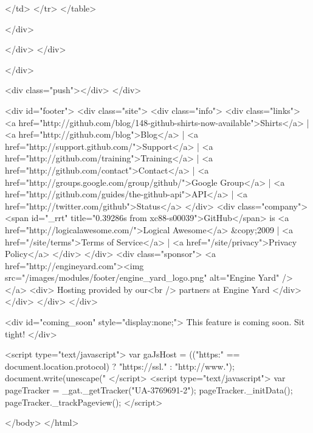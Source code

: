           </td>
        </tr>
      </table>
    
  </div>


      </div>
    </div>
    
  


  </div>

      
      
      <div class="push"></div>
    </div>
    
    <div id="footer">
      <div class="site">
        <div class="info">
          <div class="links">
            <a href="http://github.com/blog/148-github-shirts-now-available">Shirts</a> |
            <a href="http://github.com/blog">Blog</a> |
            <a href="http://support.github.com/">Support</a> |
            <a href="http://github.com/training">Training</a> |
            <a href="http://github.com/contact">Contact</a> |
            <a href="http://groups.google.com/group/github/">Google Group</a> |
            <a href="http://github.com/guides/the-github-api">API</a> |
            <a href="http://twitter.com/github">Status</a>
          </div>
          <div class="company">
            <span id="_rrt" title="0.39286s from xc88-s00039">GitHub</span>
            is <a href="http://logicalawesome.com/">Logical Awesome</a> &copy;2009 | <a href="/site/terms">Terms of Service</a> | <a href="/site/privacy">Privacy Policy</a>
          </div>
        </div>
        <div class="sponsor">
          <a href="http://engineyard.com"><img src="/images/modules/footer/engine_yard_logo.png" alt="Engine Yard" /></a>
          <div>
            Hosting provided by our<br /> partners at Engine Yard
          </div>
        </div>
      </div>
    </div>
    
    <div id="coming_soon" style="display:none;">
      This feature is coming soon.  Sit tight!
    </div>

    
        <script type="text/javascript">
    var gaJsHost = (("https:" == document.location.protocol) ? "https://ssl." : "http://www.");
    document.write(unescape("%
    </script>
    <script type="text/javascript">
    var pageTracker = _gat._getTracker("UA-3769691-2");
    pageTracker._initData();
    pageTracker._trackPageview();
    </script>

    
  </body>
</html>

